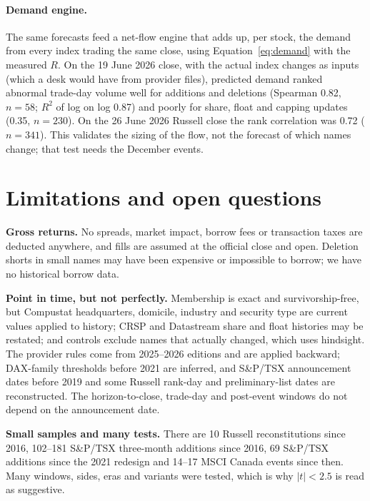 \documentclass[10pt, a4paper, twocolumn]{article}
\begin{document}
\paragraph{Demand engine.} The same forecasts feed a net-flow engine that adds up, per stock, the demand from every index trading the same close, using Equation~\eqref{eq:demand} with the measured $R$. On the 19 June 2026 close, with the actual index changes as inputs (which a desk would have from provider files), predicted demand ranked abnormal trade-day volume well for additions and deletions (Spearman 0.82, $n = 58$; $R^2$ of log on log 0.87) and poorly for share, float and capping updates (0.35, $n = 230$). On the 26 June 2026 Russell close the rank correlation was 0.72 ($n = 341$). This validates the sizing of the flow, not the forecast of which names change; that test needs the December events.

\section{Limitations and open questions}
\label{sec:limits}

\textbf{Gross returns.} No spreads, market impact, borrow fees or transaction taxes are deducted anywhere, and fills are assumed at the official close and open. Deletion shorts in small names may have been expensive or impossible to borrow; we have no historical borrow data.

\textbf{Point in time, but not perfectly.} Membership is exact and survivorship-free, but Compustat headquarters, domicile, industry and security type are current values applied to history; CRSP and Datastream share and float histories may be restated; and controls exclude names that actually changed, which uses hindsight. The provider rules come from 2025--2026 editions and are applied backward; DAX-family thresholds before 2021 are inferred, and S\&P/TSX announcement dates before 2019 and some Russell rank-day and preliminary-list dates are reconstructed. The horizon-to-close, trade-day and post-event windows do not depend on the announcement date.

\textbf{Small samples and many tests.} There are 10 Russell reconstitutions since 2016, 102--181 S\&P/TSX three-month additions since 2016, 69 S\&P/TSX additions since the 2021 redesign and 14--17 MSCI Canada events since then. Many windows, sides, eras and variants were tested, which is why $|t| < 2.5$ is read as suggestive.
\end{document}
